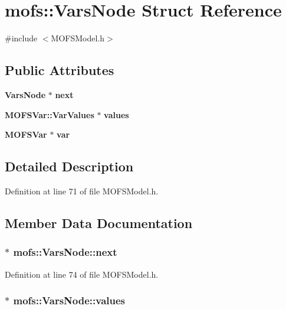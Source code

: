 \section{mofs\-:\-:Vars\-Node Struct Reference}
\label{structmofs_1_1VarsNode}


{\ttfamily \#include $<$M\-O\-F\-S\-Model.\-h$>$}

\subsection*{Public Attributes}
\begin{DoxyCompactItemize}
\item 
{\bf Vars\-Node} $\ast$ {\bf next}
\item 
{\bf M\-O\-F\-S\-Var\-::\-Var\-Values} $\ast$ {\bf values}
\item 
{\bf M\-O\-F\-S\-Var} $\ast$ {\bf var}
\end{DoxyCompactItemize}


\subsection{Detailed Description}


Definition at line 71 of file M\-O\-F\-S\-Model.\-h.



\subsection{Member Data Documentation}
\subsubsection[{next}]{$\ast$ mofs\-::\-Vars\-Node\-::next}\label{structmofs_1_1VarsNode_a1bf741f0be28b21a3085db58471efe0f}


Definition at line 74 of file M\-O\-F\-S\-Model.\-h.

\subsubsection[{values}]{$\ast$ mofs\-::\-Vars\-Node\-::values}\label{structmofs_1_1VarsNode_a169c3114e7de00d16c34b483255ed0ba}


